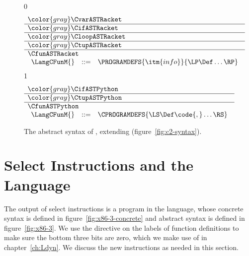 \documentclass[7x10]{TimesAPriori_MIT}%
\newcommand{\gray}[1]{{\color{gray} #1}}
\def\racketEd{0}
\def\pythonEd{1}
\def\edition{0}
\numberwithin{theorem}{chapter}
\numberwithin{definition}{chapter}
\numberwithin{equation}{chapter}
\begin{document}
\begin{figure}[tp]
  \begin{tcolorbox}[colback=white]
\small
{\if\edition\racketEd
\[
\begin{array}{l}
  \gray{\CvarASTRacket} \\ \hline
  \gray{\CifASTRacket} \\ \hline
  \gray{\CloopASTRacket} \\ \hline
  \gray{\CtupASTRacket} \\ \hline
  \CfunASTRacket \\
  \begin{array}{lcl}
  \LangCFunM{} & ::= & \PROGRAMDEFS{\itm{info}}{\LP\Def\ldots\RP} 
  \end{array}
\end{array}
\]
\fi}
{\if\edition\pythonEd
\[
  \begin{array}{l}
  \gray{\CifASTPython} \\ \hline
  \gray{\CtupASTPython} \\ \hline
  \CfunASTPython \\
  \begin{array}{lcl}
    \LangCFunM{} & ::= & \CPROGRAMDEFS{\LS\Def\code{,}\ldots\RS} 
  \end{array}
  \end{array}
\]
\fi}
  \end{tcolorbox}

\caption{The abstract syntax of \LangCFun{}, extending \LangCVec{} (figure~\ref{fig:c2-syntax}).}
\label{fig:c3-syntax}
\end{figure}

\clearpage

\section{Select Instructions and the \LangXIndCall{} Language}
\label{sec:select-r4}

The output of select instructions is a program in the \LangXIndCall{}
language, whose concrete syntax is defined in
figure~\ref{fig:x86-3-concrete} and abstract syntax is defined in
figure~\ref{fig:x86-3}.  We use the  directive on the
labels of function definitions to make sure the bottom three bits are
zero, which we make use of in chapter~\ref{ch:Ldyn}. We discuss the
new instructions as needed in this section.  

\newcommand{\GrammarXIndCall}{
\begin{array}{lcl}
\Instr &::=&  \key{callq}\;\key{*}\Arg \MID \key{tailjmp}\;\Arg 
     \MID \key{leaq}\;\Arg\key{,}\;\key{\%}\Reg \\
\Block &::= & \Instr^{+} \\
\Def &::= & \code{.globl}\,\code{.align 8}\,\itm{label}\; (\itm{label}\key{:}\, \Block)^{*} 
\end{array}
}
\end{document}
